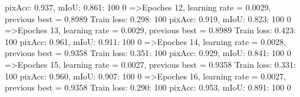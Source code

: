pixAcc: 0.937, mIoU: 0.861: 100%
  0%
=>Epoches 12, learning rate = 0.0029,                 previous best = 0.8989
Train loss: 0.298: 100%
pixAcc: 0.919, mIoU: 0.823: 100%
  0%
=>Epoches 13, learning rate = 0.0029,                 previous best = 0.8989
Train loss: 0.423: 100%
pixAcc: 0.961, mIoU: 0.911: 100%
  0%
=>Epoches 14, learning rate = 0.0028,                 previous best = 0.9358
Train loss: 0.351: 100%
pixAcc: 0.929, mIoU: 0.841: 100%
  0%
=>Epoches 15, learning rate = 0.0027,                 previous best = 0.9358
Train loss: 0.331: 100%
pixAcc: 0.960, mIoU: 0.907: 100%
  0%
=>Epoches 16, learning rate = 0.0027,                 previous best = 0.9358
Train loss: 0.290: 100%
pixAcc: 0.953, mIoU: 0.891: 100%
  0%
